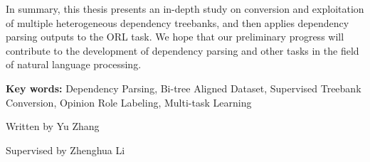 \begin{eabstract}
\begin{enumerate}
    \end{enumerate}

    In summary, this thesis presents an in-depth study on conversion and exploitation of multiple heterogeneous dependency treebanks, and then applies dependency parsing outputs to the ORL task.
    We hope that our preliminary progress will contribute to the development of dependency parsing and other tasks in the field of natural language processing.


    \vskip 21bp
        {\bf{} Key words: }
    Dependency Parsing,
    Bi-tree Aligned Dataset,
    Supervised Treebank Conversion,
    Opinion Role Labeling,
    Multi-task Learning
\end{eabstract}

\begin{flushright}
    Written by Yu Zhang

    Supervised by Zhenghua Li
\end{flushright}
